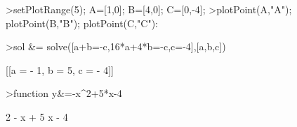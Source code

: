 \documentclass[12pt,arial,letterpaper]{book}
\begin{document}
\begin{eulernootebook}
\begin{eulercomment}
\begin{eulercomment}
\begin{eulernootebook}
\begin{eulercomment}
\begin{eulercomment}
\begin{eulercomment}
\begin{eulercomment}
\begin{eulercomment}
\begin{eulercomment}
\begin{eulernotebook}
\begin{eulercomment}
\begin{eulercomment}
\begin{eulercomment}
\begin{eulercomment}
\begin{eulercomment}
\begin{eulercomment}
\begin{eulercomment}
\end{eulercomment}
\begin{eulerprompt}
>setPlotRange(5); A=[1,0]; B=[4,0]; C=[0,-4];
>plotPoint(A,"A"); plotPoint(B,"B"); plotPoint(C,"C"):
\end{eulerprompt}
\begin{eulerprompt}
>sol &= solve([a+b=-c,16*a+4*b=-c,c=-4],[a,b,c])
\end{eulerprompt}
\begin{euleroutput}
  
                       [[a = - 1, b = 5, c = - 4]]
  
\end{euleroutput}
\begin{eulerprompt}
>function y&=-x^2+5*x-4
\end{eulerprompt}
\begin{euleroutput}
  
                                 2
                              - x  + 5 x - 4
  

\end{euleroutput}
\end{eulercomment}
\end{eulercomment}
\end{eulercomment}
\end{eulercomment}
\end{eulercomment}
\end{eulercomment}
\end{eulernotebook}
\end{eulercomment}
\end{eulercomment}
\end{eulercomment}
\end{eulercomment}
\end{eulercomment}
\end{eulercomment}
\end{eulernootebook}
\end{eulercomment}
\end{eulercomment}
\end{eulernootebook}
\end{document}
